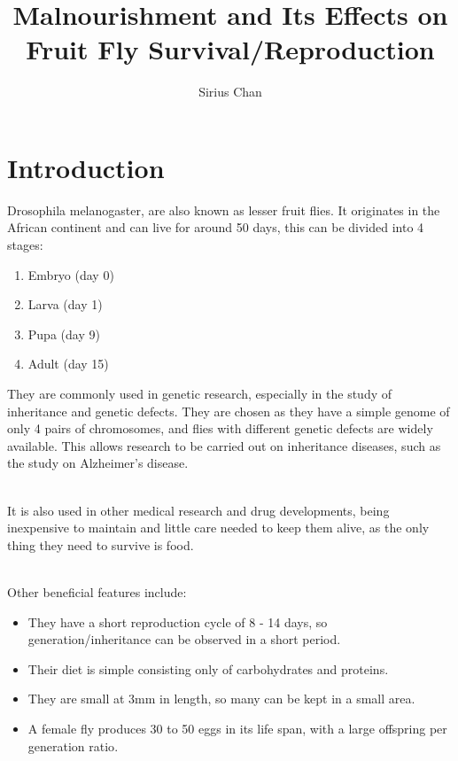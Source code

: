 \documentclass{article}
\title{Malnourishment and Its Effects on Fruit Fly Survival/Reproduction}
\author{Sirius Chan}
\begin{document}
\maketitle
\thispagestyle{empty}

\newpage

\section{Introduction}

Drosophila melanogaster, are also known as lesser fruit flies. It originates in the African continent and can live for around 50 days, this can be divided into 4 stages\cite{wiki_fly}:

\begin{enumerate}
    \item Embryo (day 0)
    \item Larva (day 1)
    \item Pupa (day 9)
    \item Adult (day 15)
\end{enumerate}

\noindent
They are commonly used in genetic research, especially in the study of inheritance and genetic defects. They are chosen as they have a simple genome of only 4 pairs of chromosomes, and flies with different genetic defects are widely available. This allows research to be carried out on inheritance diseases, such as the study on Alzheimer's disease\cite{alzheimers}.

\noindent\\
It is also used in other medical research and drug developments, being inexpensive to maintain and little care needed to keep them alive, as the only thing they need to survive is food\cite{fly_facts}.

\noindent\\
Other beneficial features include:

\begin{itemize}
    \item They have a short reproduction cycle of 8 - 14 days, so generation/inheritance can be observed in a short period.
    \item Their diet is simple consisting only of carbohydrates and proteins.
    \item They are small at 3mm in length, so many can be kept in a small area.
    \item A female fly produces 30 to 50 eggs in its life span, with a large offspring per generation ratio\cite{fly_facts}.
\end{itemize}
\end{document}
